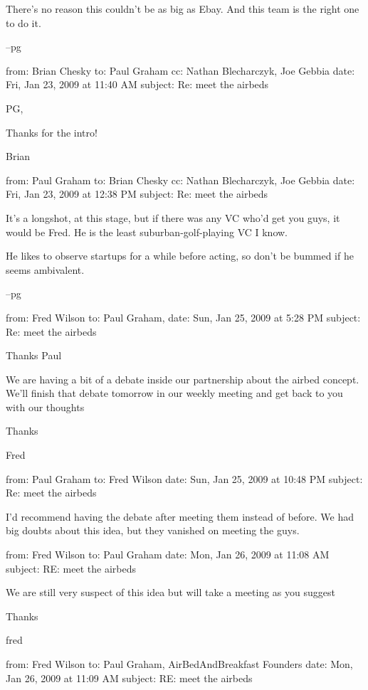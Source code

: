 There's no reason this couldn't be as big as Ebay.  And this team
is the right one to do it.

--pg



from: Brian Chesky
to: Paul Graham
cc: Nathan Blecharczyk, Joe Gebbia
date: Fri, Jan 23, 2009 at 11:40 AM
subject: Re: meet the airbeds

PG,

Thanks for the intro!

Brian



from: Paul Graham
to: Brian Chesky
cc: Nathan Blecharczyk, Joe Gebbia
date: Fri, Jan 23, 2009 at 12:38 PM
subject: Re: meet the airbeds

It's a longshot, at this stage, but if there was any VC who'd get
you guys, it would be Fred.  He is the least suburban-golf-playing
VC I know.

He likes to observe startups for a while before acting, so don't
be bummed if he seems ambivalent.

--pg



from: Fred Wilson
to: Paul Graham,
date: Sun, Jan 25, 2009 at 5:28 PM
subject: Re: meet the airbeds

Thanks Paul

We are having a bit of a debate inside our partnership about the
airbed concept. We'll finish that debate tomorrow in our weekly
meeting and get back to you with our thoughts

Thanks

Fred



from: Paul Graham
to: Fred Wilson
date: Sun, Jan 25, 2009 at 10:48 PM
subject: Re: meet the airbeds

I'd recommend having the debate after meeting them instead of before.
We had big doubts about this idea, but they vanished on meeting the
guys.



from: Fred Wilson
to: Paul Graham
date: Mon, Jan 26, 2009 at 11:08 AM
subject: RE: meet the airbeds

We are still very suspect of this idea but will take a meeting as
you suggest

Thanks

fred



from: Fred Wilson
to: Paul Graham, AirBedAndBreakfast Founders
date: Mon, Jan 26, 2009 at 11:09 AM
subject: RE: meet the airbeds

